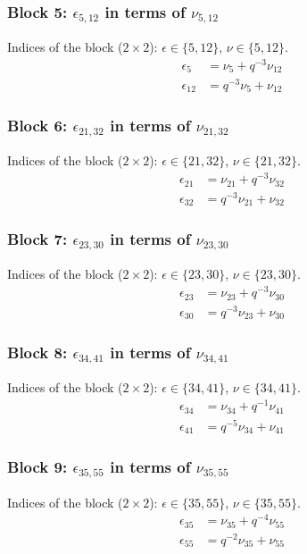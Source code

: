\subsubsection{Block 5: $\epsilon_{5, 12}$ in terms of $\nu_{5, 12}$}
Indices of the block ($2\times 2$): $\epsilon \in \{5, 12\}$, $\nu \in \{5, 12\}$.
\begin{align*}
\epsilon_{5} &= \nu_{5} + q^{-3}\nu_{12}\\
\epsilon_{12} &= q^{-3}\nu_{5} + \nu_{12}
\end{align*}

\subsubsection{Block 6: $\epsilon_{21, 32}$ in terms of $\nu_{21, 32}$}
Indices of the block ($2\times 2$): $\epsilon \in \{21, 32\}$, $\nu \in \{21, 32\}$.
\begin{align*}
\epsilon_{21} &= \nu_{21} + q^{-3}\nu_{32}\\
\epsilon_{32} &= q^{-3}\nu_{21} + \nu_{32}
\end{align*}

\subsubsection{Block 7: $\epsilon_{23, 30}$ in terms of $\nu_{23, 30}$}
Indices of the block ($2\times 2$): $\epsilon \in \{23, 30\}$, $\nu \in \{23, 30\}$.
\begin{align*}
\epsilon_{23} &= \nu_{23} + q^{-3}\nu_{30}\\
\epsilon_{30} &= q^{-3}\nu_{23} + \nu_{30}
\end{align*}

\subsubsection{Block 8: $\epsilon_{34, 41}$ in terms of $\nu_{34, 41}$}
Indices of the block ($2\times 2$): $\epsilon \in \{34, 41\}$, $\nu \in \{34, 41\}$.
\begin{align*}
\epsilon_{34} &= \nu_{34} + q^{-1}\nu_{41}\\
\epsilon_{41} &= q^{-5}\nu_{34} + \nu_{41}
\end{align*}

\subsubsection{Block 9: $\epsilon_{35, 55}$ in terms of $\nu_{35, 55}$}
Indices of the block ($2\times 2$): $\epsilon \in \{35, 55\}$, $\nu \in \{35, 55\}$.
\begin{align*}
\epsilon_{35} &= \nu_{35} + q^{-4}\nu_{55}\\
\epsilon_{55} &= q^{-2}\nu_{35} + \nu_{55}
\end{align*}


